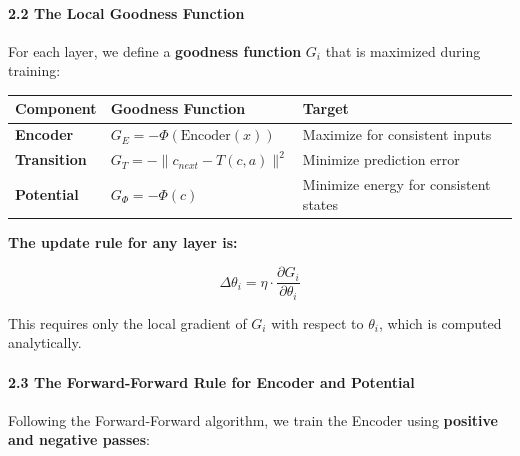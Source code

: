 \documentclass[
  11pt,
  a4paper,
]{article}
\begin{document}
\paragraph{2.2 The Local Goodness
Function}\label{the-local-goodness-function}

For each layer, we define a \textbf{goodness function} \(G_i\) that is
maximized during training:

\begin{longtable}[]{@{}
  >{\raggedright\arraybackslash}p{}
  >{\raggedright\arraybackslash}p{}
  >{\raggedright\arraybackslash}p{}@{}}
\toprule\noalign{}
\begin{minipage}[b]{\linewidth}\raggedright
Component
\end{minipage} & \begin{minipage}[b]{\linewidth}\raggedright
Goodness Function
\end{minipage} & \begin{minipage}[b]{\linewidth}\raggedright
Target
\end{minipage} \\
\midrule\noalign{}
\endhead
\bottomrule\noalign{}
\endlastfoot
\textbf{Encoder} & \(G_E = -\Phi(\text{Encoder}(x))\) & Maximize for
consistent inputs \\
\textbf{Transition} & \(G_T = -\|c_{next} - T(c,a)\|^2\) & Minimize
prediction error \\
\textbf{Potential} & \(G_\Phi = -\Phi(c)\) & Minimize energy for
consistent states \\
\end{longtable}

\textbf{The update rule for any layer is:}

\[\Delta \theta_i = \eta \cdot \frac{\partial G_i}{\partial \theta_i}\]

This requires only the local gradient of \(G_i\) with respect to
\(\theta_i\), which is computed analytically.

\paragraph{2.3 The Forward-Forward Rule for Encoder and
Potential}\label{the-forward-forward-rule-for-encoder-and-potential}

Following the Forward-Forward algorithm, we train the Encoder using
\textbf{positive and negative passes}:
\end{document}

